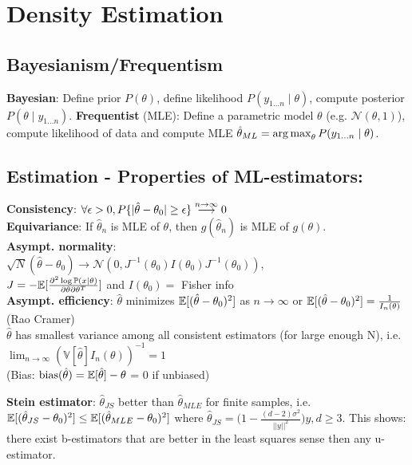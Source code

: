 \section{Density Estimation}

\subsection*{Bayesianism/Frequentism}

\textbf{Bayesian}: Define prior $P(\theta)$,
define likelihood $P(y_{1 \ldots n} \mid \theta)$,
compute posterior $P(\theta \mid y_{1 \ldots n})$.
\textbf{Frequentist} (MLE):
Define a parametric model $\theta$ (e.g. $\mathcal{N}(\theta, 1)$),
compute likelihood of data
and compute MLE $\hat{\theta}_{ML} = \operatorname*{arg\,max}_{\theta} P(y_{1 \ldots n} \mid \theta)$.


\subsection*{Estimation - Properties of ML-estimators:}
\textbf{Consistency}: $\forall\epsilon>0, P \{|\hat{\theta}-\theta_0| \geq\epsilon\} \stackrel{\tiny n \to\infty}{\longrightarrow} 0 $\\
\textbf{Equivariance}: If $\hat \theta_n$ is MLE of $\theta$, then $g(\hat \theta_n)$ is MLE of $g(\theta)$.\\
\textbf{Asympt. normality}:\\
$\sqrt{N}(\hat{\theta} - \theta_0) \to \mathcal{N}(0, J^{-1}(\theta_0)I(\theta_0)J^{-1}(\theta_0))$,\\ 
$J= -\mathbb E[\frac{\partial^2 \log \mathbb{P}(x|\theta) }{\partial \theta \partial \theta ^{T}}]$ and $I(\theta_0)=$ Fisher info \\
\textbf{Asympt. efficiency}: $\hat{\theta}$ minimizes $\mathbb E[(\hat{\theta}-\theta_0)^2]$ as $n \to\infty$ or $\mathbb E[(\hat{\theta}-\theta_0)^2] = \frac{1}{I_n(\theta)}$ (Rao Cramer)\\
$\hat{\theta}$ has smallest variance among all consistent estimators (for large enough N), i.e. $\lim_{n\to\infty} (\mathbb{V}[\hat{\theta}]I_n(\theta))^{-1} = 1$\\
(Bias: $\text{bias}(\hat{\theta}) = \mathbb E[\hat{\theta}]-\theta$ = 0 if unbiased)

\textbf{Stein estimator}: $\hat{\theta}_{JS}$ better than $\hat{\theta}_{MLE}$ for finite samples, i.e. $\mathbb E[(\hat{\theta}_{JS}-\theta_0)^2]\leq \mathbb E[(\hat{\theta}_{MLE}-\theta_0)^2]$ where $\hat{\theta}_{JS}=\big(1-\frac{(d-2)\sigma^2}{||y||^2}\big)y, d\geq 3$. This shows: there exist b-estimators that are better in the least squares sense then any u-estimator.

